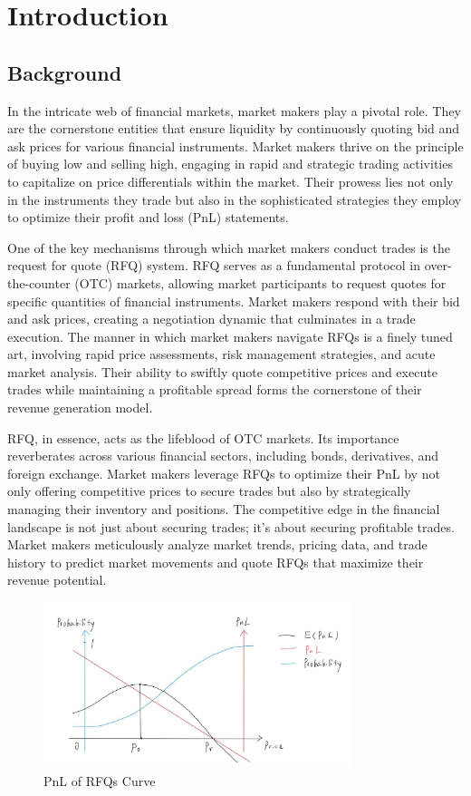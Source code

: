\chapter{Introduction} \label{Chap1}
\section{Background}
In the intricate web of financial markets, market makers play a pivotal role. They are the cornerstone entities that ensure liquidity by continuously quoting bid and ask prices for various financial instruments. Market makers thrive on the principle of buying low and selling high, engaging in rapid and strategic trading activities to capitalize on price differentials within the market. Their prowess lies not only in the instruments they trade but also in the sophisticated strategies they employ to optimize their profit and loss (PnL) statements.

One of the key mechanisms through which market makers conduct trades is the request for quote (RFQ) system. RFQ serves as a fundamental protocol in over-the-counter (OTC) markets, allowing market participants to request quotes for specific quantities of financial instruments. Market makers respond with their bid and ask prices, creating a negotiation dynamic that culminates in a trade execution. The manner in which market makers navigate RFQs is a finely tuned art, involving rapid price assessments, risk management strategies, and acute market analysis. Their ability to swiftly quote competitive prices and execute trades while maintaining a profitable spread forms the cornerstone of their revenue generation model.

RFQ, in essence, acts as the lifeblood of OTC markets. Its importance reverberates across various financial sectors, including bonds, derivatives, and foreign exchange. Market makers leverage RFQs to optimize their PnL by not only offering competitive prices to secure trades but also by strategically managing their inventory and positions. The competitive edge in the financial landscape is not just about securing trades; it's about securing profitable trades. Market makers meticulously analyze market trends, pricing data, and trade history to predict market movements and quote RFQs that maximize their revenue potential.

\begin{figure}[ht]
    \centering
    \includegraphics[width=0.8\textwidth]{figures/jpm/0. PnL of RFQs Curve.png}
    \caption{PnL of RFQs Curve}
    \label{fig:pnl_rfqs_curve}
\end{figure}


